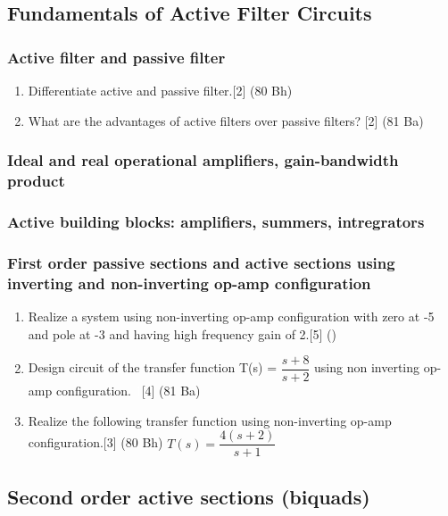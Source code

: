\documentclass[12pt]{article}
\begin{document}
\subsection{Fundamentals of Active Filter Circuits}
\subsubsection{Active filter and passive filter}
\begin{enumerate}
	\item Differentiate active and passive filter.\hfill [2] (80 Bh)
	
	\item What are the advantages of active filters over passive filters? \hfill [2] (81 Ba)
\end{enumerate}
\subsubsection{Ideal and real operational amplifiers, gain-bandwidth product}
\subsubsection{Active building blocks: amplifiers, summers, intregrators}
\subsubsection{First order passive sections and active sections using inverting and non-inverting op-amp configuration}
\begin{enumerate}
\item Realize a system using non-inverting op-amp configuration with zero at -5 and pole at -3 and having high frequency gain of 2.\hfill[5] ()
\item Design circuit of the transfer function T(s) = $\dfrac{s+8}{s+2}$ using non inverting op-amp configuration. \textcolor{white}{1}\hfill [4] (81 Ba)
\item Realize the following transfer function using non-inverting op-amp configuration.\hfill [3] (80 Bh)
$T(s) = \dfrac{4(s+2)}{s+1}$
\end{enumerate}
\subsection{Second order active sections (biquads)}
\end{document}
